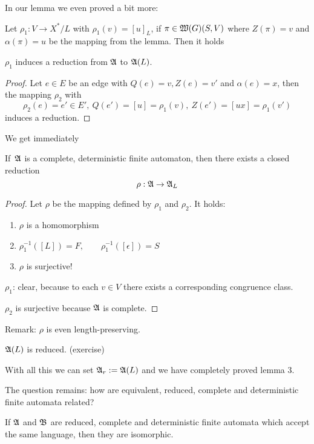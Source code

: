 \medskip
In our lemma we even proved a bit more:

Let $\rho_1 : V \to X^*/L$ with $\rho_1(v) = [u]_L$, if $\pi \in
\mbox{$\mathfrak{W}({G})$}(S, V)$ where $Z(\pi) = v$ and $\alpha(\pi) = u$ be the mapping from
the lemma. Then it holds

\begin{lemma}
$\rho_1$ induces a reduction from $\mbox{$\mathfrak{A}$}$ to $\mbox{$\mathfrak{A}$}(L)$.
\end{lemma}

\begin{proof}
Let $e \in E$ be an edge with $Q(e) = v, Z(e) = v'$ and $\alpha(e) = x$, then
the mapping $\rho_2$ with 
\[ \rho_2(e) = e' \in E',\ Q(e') = [u] = \rho_1(v),\ Z(e') = [ux] = \rho_1(v')
\]
induces a reduction.
\end{proof}

We get immediately

\begin{theorem}If\ $\mbox{$\mathfrak{A}$}$ is a complete, deterministic finite automaton, then
there exists a closed reduction \[ \rho : \mbox{$\mathfrak{A}$} \to \mbox{$\mathfrak{A}$}_L \]
\end{theorem}

\begin{proof}
Let $\rho$ be the mapping defined by $\rho_1$ and $\rho_2$. It holds:
\begin{enumerate}
  \item $\rho$ is a homomorphism
  \item $\rho_1^{-1}([L]) = F,\qquad \rho_1^{-1}([\epsilon]) = S$
  \item $\rho$ is surjective!
\end{enumerate}

$\rho_1$: clear, because to each $v \in V$ there exists a corresponding
congruence class.

$\rho_2$ is surjective because $\mbox{$\mathfrak{A}$}$ is complete.
\end{proof}

Remark: $\rho$ is even length-preserving.

\bigskip
\begin{corollary}
$\mbox{$\mathfrak{A}$}(L)$ is reduced. (exercise)
\end{corollary}

With all this we can set $\mbox{$\mathfrak{A}$}_r := \mbox{$\mathfrak{A}$}(L)$ and we have completely proved
lemma 3.

The question remains: how are equivalent, reduced, complete and deterministic
finite automata related?

\bigskip
\begin{theorem}
If $\mbox{$\mathfrak{A}$}$ and $\mbox{$\mathfrak{B}$}$ are reduced, complete and deterministic finite
automata which accept the same language, then they are isomorphic.
\end{theorem}

